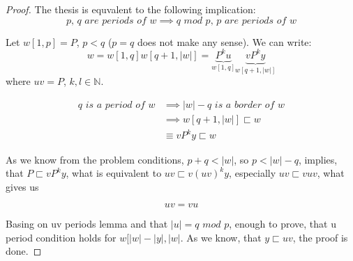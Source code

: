 \documentclass{scrartcl}
\begin{document}
  \section{}
    \begin{proof}
      The thesis is equvalent to the following implication:
      \[\textit{p, q are periods of } w \implies \textit{q mod p, p are periods of w}\]
      
      Let $w[1, p] = P$, $p < q$ ($p = q$ does not make any sense). We can write:
      \[w = w[1, q]w[q + 1, |w|] = \underbrace{P^ku}_{w[1, q]}\underbrace{vP^ky}_{w[q + 1, |w|]}\]
      where $uv = P$, $k,l \in \mathbb{N}$.
      
      \begin{equation}
        \begin{split}
          q \textit{ is a period of } w &\implies |w| - q \textit{ is a border of } w \\ &\implies
          w[q + 1, |w|] \sqsubset w \\ &\equiv vP^ky \sqsubset w
        \end{split}
      \end{equation}
      
      As we know from the problem conditions, $p + q < |w|$, so $p < |w| - q$, implies, that $P \sqsubset vP^ky$, what is equivalent to $uv \sqsubset v(uv)^ky$, especially $uv \sqsubset vuv$, what gives us
      
      \begin{equation}
        uv = vu
      \end{equation}
      
      Basing on uv periods lemma and that $|u| = \textit{q mod p}$, enough to prove, that u period condition holds for $w[|w| - |y|, |w|$. As we know, that $y \sqsubset uv$, the proof is done.
    \end{proof}
      
\end{document}
